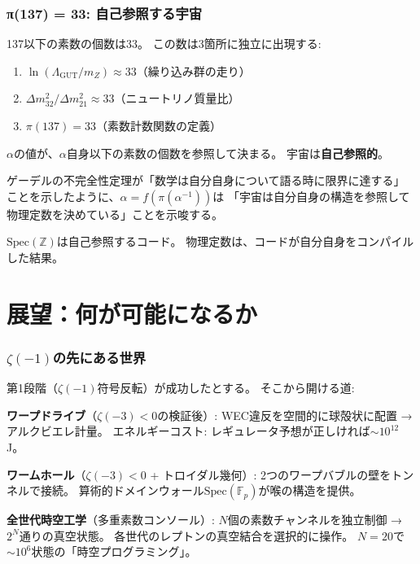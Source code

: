 \documentclass[11pt,a4paper]{article}
\newcommand{\Spec}{\mathrm{Spec}}
\begin{document}
\section{π(137) = 33: 自己参照する宇宙}

137以下の素数の個数は33。
この数は3箇所に独立に出現する:
\begin{enumerate}
\item $\ln(\Lambda_{\mathrm{GUT}}/m_Z) \approx 33$（繰り込み群の走り）
\item $\Delta m^2_{32}/\Delta m^2_{21} \approx 33$（ニュートリノ質量比）
\item $\pi(137) = 33$（素数計数関数の定義）
\end{enumerate}

$\alpha$の値が、$\alpha$自身以下の素数の個数を参照して決まる。
宇宙は\textbf{自己参照的}。

\begin{epigraph}
ゲーデルの不完全性定理が「数学は自分自身について語る時に限界に達する」
ことを示したように、$\alpha = f(\pi(\alpha^{-1}))$は
「宇宙は自分自身の構造を参照して物理定数を決めている」ことを示唆する。

$\Spec(\mathbb{Z})$は自己参照するコード。
物理定数は、コードが自分自身をコンパイルした結果。
\end{epigraph}

\part{展望：何が可能になるか}

\section{$\zeta(-1)$の先にある世界}

第1段階（$\zeta(-1)$符号反転）が成功したとする。
そこから開ける道:

\textbf{ワープドライブ}（$\zeta(-3) < 0$の検証後）:
WEC違反を空間的に球殻状に配置 → アルクビエレ計量。
エネルギーコスト: レギュレータ予想が正しければ$\sim 10^{12}$ J。

\textbf{ワームホール}（$\zeta(-3) < 0$ + トロイダル幾何）:
2つのワープバブルの壁をトンネルで接続。
算術的ドメインウォール$\Spec(\mathbb{F}_p)$が喉の構造を提供。

\textbf{全世代時空工学}（多重素数コンソール）:
$N$個の素数チャンネルを独立制御 → $2^N$通りの真空状態。
各世代のレプトンの真空結合を選択的に操作。
$N = 20$で$\sim 10^6$状態の「時空プログラミング」。
\end{document}
